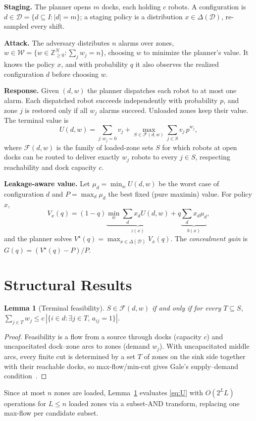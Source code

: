 \documentclass[10pt,twocolumn,letterpaper]{article}
\newtheorem{lemma}{Lemma}
\theoremstyle{remark}
\newcommand{\D}{\mathcal{D}}
\newcommand{\W}{\mathcal{W}}
\begin{document}
\textbf{Staging.} The planner opens $m$ docks, each holding $c$ robots. A configuration is $d\in\D=\{d\subseteq I:|d|=m\}$; a staging policy is a distribution $x\in\Delta(\D)$, re-sampled every shift.

\textbf{Attack.} The adversary distributes $n$ alarms over zones, $w\in\W=\{w\in\mathbb{Z}^N_{\ge0}:\sum_j w_j=n\}$, choosing $w$ to minimize the planner's value. It knows the policy $x$, and with probability $q$ it also observes the realized configuration $d$ before choosing $w$.

\textbf{Response.} Given $(d,w)$ the planner dispatches each robot to at most one alarm. Each dispatched robot succeeds independently with probability $p$, and zone $j$ is restored only if all $w_j$ alarms succeed. Unloaded zones keep their value. The terminal value is
\begin{equation}\label{eq:U}
U(d,w)=\sum_{j:w_j=0}v_j+\max_{S\in\mathcal{F}(d,w)}\sum_{j\in S}v_j\,p^{w_j},
\end{equation}
where $\mathcal{F}(d,w)$ is the family of loaded-zone sets $S$ for which robots at open docks can be routed to deliver exactly $w_j$ robots to every $j\in S$, respecting reachability and dock capacity $c$.

\textbf{Leakage-aware value.} Let $\mu_d=\min_{w}U(d,w)$ be the worst case of configuration $d$ and $P=\max_d \mu_d$ the best fixed (pure maximin) value. For policy $x$,
\begin{equation}\label{eq:Vx}
V_x(q)=(1-q)\underbrace{\min_{w}\sum_{d}x_dU(d,w)}_{z(x)}+q\underbrace{\sum_d x_d\mu_d}_{b(x)},
\end{equation}
and the planner solves $V^\star(q)=\max_{x\in\Delta(\D)}V_x(q)$. The \emph{concealment gain} is $G(q)=(V^\star(q)-P)/P$.

\section{Structural Results}\label{sec:theory}
\begin{lemma}[Terminal feasibility]\label{lem:gale}
$S\in\mathcal{F}(d,w)$ if and only if for every $T\subseteq S$, $\sum_{j\in T}w_j\le c\,|\{i\in d:\exists j\in T,\,a_{ij}=1\}|$.
\end{lemma}
\begin{proof}
Feasibility is a flow from a source through docks (capacity $c$) and uncapacitated dock--zone arcs to zones (demand $w_j$). With uncapacitated middle arcs, every finite cut is determined by a set $T$ of zones on the sink side together with their reachable docks, so max-flow/min-cut gives Gale's supply--demand condition~\cite{gale1957}.
\end{proof}
Since at most $n$ zones are loaded, Lemma~\ref{lem:gale} evaluates \eqref{eq:U} with $O(2^{L}L)$ operations for $L\le n$ loaded zones via a subset-AND transform, replacing one max-flow per candidate subset.
\end{document}
